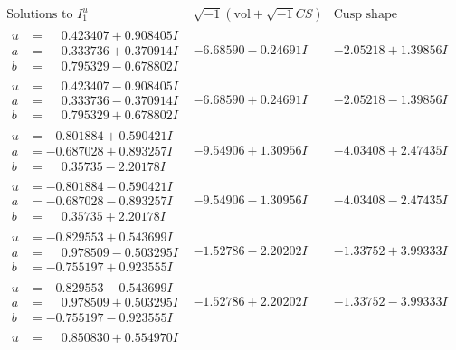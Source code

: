\documentclass[1p]{elsarticle_modified}
\theoremstyle{definition}
\newcommand{\I}{\sqrt{-1}}
\begin{document}
$$\begin{array}{c|c|c}  
\text{Solutions to }I^u_{1}& \I (\text{vol} + \sqrt{-1}CS) & \text{Cusp shape}\\
 \hline 
\begin{aligned}
u &= \phantom{-}0.423407 + 0.908405 I \\
a &= \phantom{-}0.333736 + 0.370914 I \\
b &= \phantom{-}0.795329 - 0.678802 I\end{aligned}
 & -6.68590 - 0.24691 I & -2.05218 + 1.39856 I \\ \hline\begin{aligned}
u &= \phantom{-}0.423407 - 0.908405 I \\
a &= \phantom{-}0.333736 - 0.370914 I \\
b &= \phantom{-}0.795329 + 0.678802 I\end{aligned}
 & -6.68590 + 0.24691 I & -2.05218 - 1.39856 I \\ \hline\begin{aligned}
u &= -0.801884 + 0.590421 I \\
a &= -0.687028 + 0.893257 I \\
b &= \phantom{-}0.35735 - 2.20178 I\end{aligned}
 & -9.54906 + 1.30956 I & -4.03408 + 2.47435 I \\ \hline\begin{aligned}
u &= -0.801884 - 0.590421 I \\
a &= -0.687028 - 0.893257 I \\
b &= \phantom{-}0.35735 + 2.20178 I\end{aligned}
 & -9.54906 - 1.30956 I & -4.03408 - 2.47435 I \\ \hline\begin{aligned}
u &= -0.829553 + 0.543699 I \\
a &= \phantom{-}0.978509 - 0.503295 I \\
b &= -0.755197 + 0.923555 I\end{aligned}
 & -1.52786 - 2.20202 I & -1.33752 + 3.99333 I \\ \hline\begin{aligned}
u &= -0.829553 - 0.543699 I \\
a &= \phantom{-}0.978509 + 0.503295 I \\
b &= -0.755197 - 0.923555 I\end{aligned}
 & -1.52786 + 2.20202 I & -1.33752 - 3.99333 I \\ \hline\begin{aligned}
u &= \phantom{-}0.850830 + 0.554970 I \\

\end{aligned}
\end{array}$$
\end{document}
